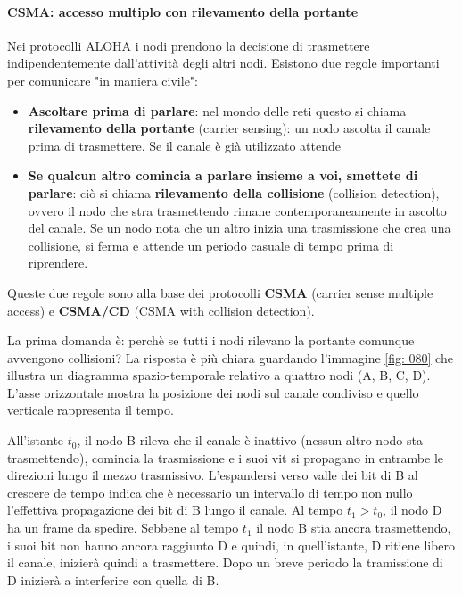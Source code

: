 \documentclass[11pt,a4paper]{book}
\begin{document}
\paragraph{CSMA: accesso multiplo con rilevamento della portante}
Nei protocolli ALOHA i nodi prendono la decisione di trasmettere indipendentemente dall'attività degli altri nodi. Esistono due regole importanti per comunicare "in maniera civile":
\begin{itemize}
	\item \textbf{Ascoltare prima di parlare}: nel mondo delle reti questo si chiama \textbf{rilevamento della portante} (carrier sensing): un nodo ascolta il canale prima di trasmettere. Se il canale è già utilizzato attende
	\item \textbf{Se qualcun altro comincia a parlare insieme a voi, smettete di parlare}: ciò si chiama \textbf{rilevamento della collisione} (collision detection), ovvero il nodo che stra trasmettendo rimane contemporaneamente in ascolto del canale. Se un nodo nota che un altro inizia una trasmissione che crea una collisione, si ferma e attende un periodo casuale di tempo prima di riprendere.
\end{itemize}
Queste due regole sono alla base dei protocolli \textbf{CSMA} (carrier sense multiple access) e \textbf{CSMA/CD} (CSMA with collision detection).

La prima domanda è: perchè se tutti i nodi rilevano la portante comunque avvengono collisioni? La risposta è più chiara guardando l'immagine \ref{fig: 080} che illustra un diagramma spazio-temporale relativo a quattro nodi (A, B, C, D). L'asse orizzontale mostra la posizione dei nodi sul canale condiviso e quello verticale rappresenta il tempo.

All'istante $t_{0}$, il nodo B rileva che il canale è inattivo (nessun altro nodo sta trasmettendo), comincia la trasmissione e i suoi vit si propagano in entrambe le direzioni lungo il mezzo trasmissivo. L'espandersi verso valle dei bit di B al crescere de tempo indica che è necessario un intervallo di tempo non nullo l'effettiva propagazione dei bit di B lungo il canale. Al tempo $t_{1} > t_{0}$, il nodo D ha un frame da spedire. Sebbene al tempo $t_{1}$ il nodo B stia ancora trasmettendo, i suoi bit non hanno ancora raggiunto D e quindi, in quell'istante, D ritiene libero il canale, inizierà quindi a trasmettere. Dopo un breve periodo la tramissione di D inizierà a interferire con quella di B.
\end{document}
